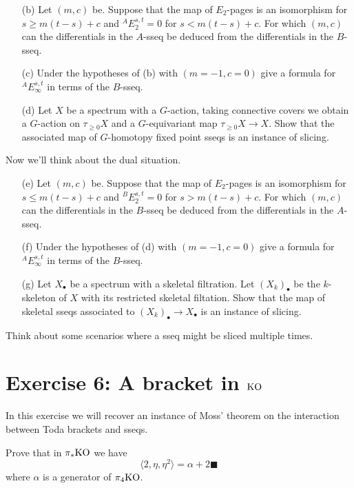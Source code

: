 \documentclass[reqno]{amsart}
\begin{document}
\begin{itemize}
\item[(b)] Let $(m,c)$ be.
  Suppose that the map of $E_2$-pages is an isomorphism
  for $s \geq m(t-s) + c$ and
  ${}^A E_2^{s,t} = 0$ for $s < m(t-s) + c$.
  For which $(m,c)$ can the differentials in the $A$-sseq be deduced from the
  differentials in the $B$-sseq.
\item[(c)] Under the hypotheses of (b)
  with $(m=-1,c=0)$ give a formula for ${}^AE_\infty^{s,t}$ in terms of the $B$-sseq.
\item[(d)] Let $X$ be a spectrum with a $G$-action, taking connective covers we
  obtain a $G$-action on $\tau_{\geq 0}X$ and a $G$-equivariant map $\tau_{\geq 0}X \to X$.
  Show that the associated map of $G$-homotopy fixed point sseqs
  is an instance of slicing.
\end{itemize}

Now we'll think about the dual situation.

\begin{itemize}
\item[(e)] Let $(m,c)$ be.
  Suppose that the map of $E_2$-pages is an isomorphism
  for $s \leq m(t-s) + c$ and
  ${}^B E_2^{s,t} = 0$ for $s > m(t-s) + c$.
  For which $(m,c)$ can the differentials in the $B$-sseq be deduced from the
  differentials in the $A$-sseq.
\item[(f)] Under the hypotheses of (d)
  with $(m=-1,c=0)$ give a formula for ${}^AE_\infty^{s,t}$ in terms of the $B$-sseq.  
\item[(g)] Let $X_\bullet$ be a spectrum with a skeletal filtration.
  Let $(X_k)_{\bullet}$ be the $k$-skeleton of $X$ with its restricted skeletal filtation.
  Show that the map of skeletal sseqs associated to $(X_k)_\bullet \to X_\bullet$
  is an instance of slicing.      
\end{itemize}
  
Think about some scenarios where a sseq might be sliced multiple times.


\section{\bf Exercise 6: A bracket in $\mathrm{KO}$}

In this exercise we will recover an instance of Moss' theorem on
the interaction between Toda brackets and sseqs.

Prove that in $\pi_*\mathrm{KO}$ we have
\[ \langle 2, \eta, \eta^2 \rangle = \alpha + 2\blacksquare \]
where $\alpha$ is a generator of $\pi_4\mathrm{KO}$.
\end{document}
